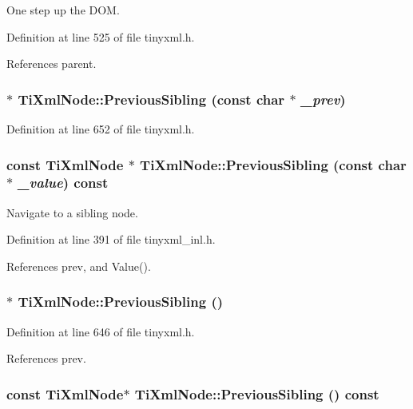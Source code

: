 One step up the DOM. 

Definition at line 525 of file tinyxml.h.

References parent.\hypertarget{class_ti_xml_node_a6c977049207177ef21b51972315c2053}{
\subsubsection[{PreviousSibling}]{$\ast$ TiXmlNode::PreviousSibling (const char $\ast$ {\em \_\-prev})}}
\label{class_ti_xml_node_a6c977049207177ef21b51972315c2053}


Definition at line 652 of file tinyxml.h.\hypertarget{class_ti_xml_node_abbb3b8c1f38fa7b9e52d584a4aeca795}{
\subsubsection[{PreviousSibling}]{\setlength{\rightskip}{0pt plus 5cm}const {\bf TiXmlNode} $\ast$ TiXmlNode::PreviousSibling (const char $\ast$ {\em \_\-value}) const}}
\label{class_ti_xml_node_abbb3b8c1f38fa7b9e52d584a4aeca795}


Navigate to a sibling node. 

Definition at line 391 of file tinyxml\_\-inl.h.

References prev, and Value().\hypertarget{class_ti_xml_node_af8c0642ad6ecc03f62953e68896ed1cc}{
\subsubsection[{PreviousSibling}]{$\ast$ TiXmlNode::PreviousSibling ()}}
\label{class_ti_xml_node_af8c0642ad6ecc03f62953e68896ed1cc}


Definition at line 646 of file tinyxml.h.

References prev.\hypertarget{class_ti_xml_node_ac2cd892768726270e511b2ab32de4d10}{
\subsubsection[{PreviousSibling}]{\setlength{\rightskip}{0pt plus 5cm}const {\bf TiXmlNode}$\ast$ TiXmlNode::PreviousSibling () const}}
\label{class_ti_xml_node_ac2cd892768726270e511b2ab32de4d10}


